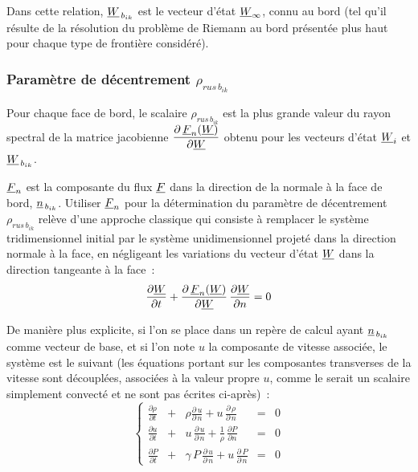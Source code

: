 Dans cette relation, $\underline{W}_{\,{b}_{ik}}$ est  le vecteur d'\'etat
$\underline{W}_{\infty}$, connu au bord (tel
qu'il r\'esulte de la r\'esolution du probl\`eme de Riemann au bord
pr\'esent\'ee plus haut pour chaque type de fronti\`ere consid\'er\'e).

\subsubsection*{Param\`etre de d\'ecentrement $\rho_{rus\,{b}_{ik}}$}

Pour chaque face de bord, le scalaire $\rho_{rus\,{b}_{ik}}$ est la
plus grande valeur du rayon spectral de la matrice jacobienne
$\displaystyle\frac{\partial\,\underline{F}_n(\underline{W})}{\partial \underline{W}}$
obtenu pour les vecteurs d'\'etat $\underline{W}_i$ et $\underline{W}_{\,{b}_{ik}}$.

$\underline{F}_n$ est la composante du
flux $\underline{F}$ dans la direction de la normale \`a la face de bord,
$\underline{n}_{\,{b}_{ik}}$. Utiliser $\underline{F}_n$
pour la d\'etermination du
param\`etre de d\'ecentrement $\rho_{rus\,{b}_{ik}}$
rel\`eve d'une approche classique qui consiste
\`a remplacer le syst\`eme tridimensionnel
initial par le syst\`eme unidimensionnel projet\'e dans la direction
normale \`a la face, en n\'egligeant les variations du vecteur d'\'etat
$\underline{W}$ dans la direction tangeante \`a la face~:
\begin{equation}
\displaystyle\frac{\partial \underline{W}}{\partial t} +\frac{\partial\,\underline{F}_n(\underline{W})}{\partial
\underline{W}}\,\frac{\partial \underline{W}}{\partial n} = 0
\end{equation}

De mani\`ere plus explicite, si l'on se place dans un rep\`ere de calcul ayant
$\underline{n}_{\,{b}_{ik}}$ comme  vecteur de base, et si l'on note $u$ la
composante de vitesse associ\'ee, le syst\`eme est le suivant (les \'equations
portant sur les composantes transverses de la vitesse sont d\'ecoupl\'ees,
associ\'ees \`a la valeur propre $u$, comme le serait un scalaire simplement
convect\'e et ne sont pas \'ecrites ci-apr\`es)~:
\begin{equation}
\left\{\begin{array}{lllll}
\displaystyle\frac{\partial\rho}{\partial t}
&+&\displaystyle\rho\frac{\partial\,u}{\partial\,n} + u\,\frac{\partial\,\rho}{\partial\,n}&=& 0 \\
\displaystyle\frac{\partial u}{\partial t}
&+&\displaystyle u\,\frac{\partial\,u}{\partial\,n}+\frac{1}{\rho}\,\frac{\partial
P}{\partial n} &=& 0 \\
\displaystyle\frac{\partial P}{\partial t}
&+&\displaystyle\gamma\,P\,\frac{\partial\,u}{\partial\,n}+u\,\frac{\partial\,P}{\partial\,n}&=& 0
\end{array}\right.
\end{equation}

